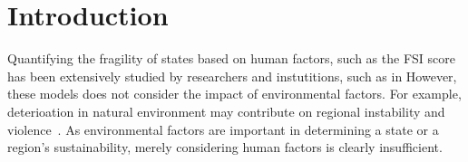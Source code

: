 \section{Introduction}	


Quantifying the fragility of states based on human factors, such as the FSI score has been extensively studied by researchers and instutitions, such as in  However, these models does not consider the impact of environmental factors. For example, deterioation in natural environment may contribute on regional instability and violence~. As environmental factors are important in determining a state or a region's sustainability, merely considering human factors is clearly insufficient. 


